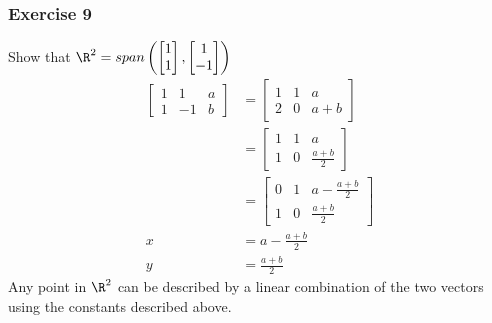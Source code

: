 \documentclass[letterpaper, 12pt]{math}
\begin{document}
\subsubsection*{Exercise 9}
Show that \( \R^2 = span\left(\begin{bmatrix}1 \\ 1\end{bmatrix},
\begin{bmatrix}1 \\ -1\end{bmatrix}\right) \)
\begin{align*}
  \begin{bmatrix}
    1 & 1 & a \\
    1 & -1 & b
  \end{bmatrix} &= \begin{bmatrix}
    1 & 1 & a \\
    2 & 0 & a+b
  \end{bmatrix} \\
  &= \begin{bmatrix}
    1 & 1 & a \\
    1 & 0 & \frac{a+b}{2}
  \end{bmatrix} \\
  &= \begin{bmatrix}
    0 & 1 & a-\frac{a+b}{2} \\
    1 & 0 & \frac{a+b}{2}
  \end{bmatrix} \\
  x &= a-\frac{a+b}{2} \\
  y &= \frac{a+b}{2}
\end{align*}
Any point in \( \R^2 \) can be described by a linear combination of the two
vectors using the constants described above.
\end{document}
